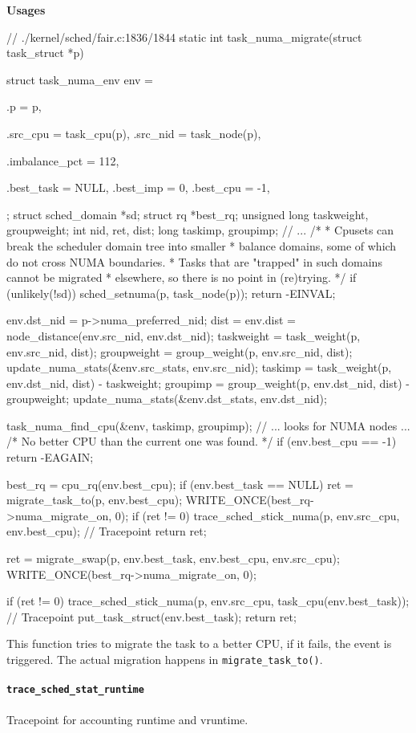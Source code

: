 \textbf{Usages}
\begin{code}
// ./kernel/sched/fair.c:1836/1844
static int task_numa_migrate(struct task_struct *p)
{
	struct task_numa_env env = {
		.p = p,

		.src_cpu = task_cpu(p),
		.src_nid = task_node(p),

		.imbalance_pct = 112,

		.best_task = NULL,
		.best_imp = 0,
		.best_cpu = -1,
	};
	struct sched_domain *sd;
	struct rq *best_rq;
	unsigned long taskweight, groupweight;
	int nid, ret, dist;
	long taskimp, groupimp;
        // ...
	/*
	 * Cpusets can break the scheduler domain tree into smaller
	 * balance domains, some of which do not cross NUMA boundaries.
	 * Tasks that are "trapped" in such domains cannot be migrated
	 * elsewhere, so there is no point in (re)trying.
	 */
	if (unlikely(!sd)) {
		sched_setnuma(p, task_node(p));
		return -EINVAL;
	}

	env.dst_nid = p->numa_preferred_nid;
	dist = env.dist = node_distance(env.src_nid, env.dst_nid);
	taskweight = task_weight(p, env.src_nid, dist);
	groupweight = group_weight(p, env.src_nid, dist);
	update_numa_stats(&env.src_stats, env.src_nid);
	taskimp = task_weight(p, env.dst_nid, dist) - taskweight;
	groupimp = group_weight(p, env.dst_nid, dist) - groupweight;
	update_numa_stats(&env.dst_stats, env.dst_nid);

	task_numa_find_cpu(&env, taskimp, groupimp);
        // ... looks for NUMA nodes ...
	/* No better CPU than the current one was found. */
	if (env.best_cpu == -1)
		return -EAGAIN;

	best_rq = cpu_rq(env.best_cpu);
	if (env.best_task == NULL) {
		ret = migrate_task_to(p, env.best_cpu);
		WRITE_ONCE(best_rq->numa_migrate_on, 0);
		if (ret != 0)
			trace_sched_stick_numa(p, env.src_cpu, env.best_cpu); // Tracepoint
		return ret;
	}

	ret = migrate_swap(p, env.best_task, env.best_cpu, env.src_cpu);
	WRITE_ONCE(best_rq->numa_migrate_on, 0);

	if (ret != 0)
		trace_sched_stick_numa(p, env.src_cpu, task_cpu(env.best_task)); // Tracepoint
	put_task_struct(env.best_task);
	return ret;
}
\end{code}
This function tries to migrate the task to a better CPU, if it fails, the event is triggered. The actual migration happens in \verb|migrate_task_to()|.

\paragraph{\texttt{trace\_sched\_stat\_runtime}}
Tracepoint for accounting runtime and vruntime.

